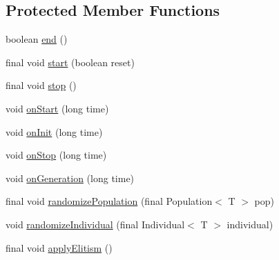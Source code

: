 \subsection*{Protected Member Functions}
\begin{DoxyCompactItemize}
\item 
boolean \hyperlink{classjenes_1_1_genetic_algorithm_3_01_t_01extends_01_chromosome_01_4_a41376d72c82d4503693eebb3832cf772}{end} ()
\item 
final void \hyperlink{classjenes_1_1_genetic_algorithm_3_01_t_01extends_01_chromosome_01_4_a6fd4badfc67b0c2b0d43c6dd4a14875e}{start} (boolean reset)
\item 
final void \hyperlink{classjenes_1_1_genetic_algorithm_3_01_t_01extends_01_chromosome_01_4_a6d0de9962bff7d63a4c197eeef6da7d0}{stop} ()
\item 
void \hyperlink{classjenes_1_1_genetic_algorithm_3_01_t_01extends_01_chromosome_01_4_a0ed4a97cf7e3266913eaad8092913de3}{on\-Start} (long time)
\item 
void \hyperlink{classjenes_1_1_genetic_algorithm_3_01_t_01extends_01_chromosome_01_4_a85479397ce0f8bd995b97fa91f4d6690}{on\-Init} (long time)
\item 
void \hyperlink{classjenes_1_1_genetic_algorithm_3_01_t_01extends_01_chromosome_01_4_a04258af6f64ec98561b015651d20f9ea}{on\-Stop} (long time)
\item 
void \hyperlink{classjenes_1_1_genetic_algorithm_3_01_t_01extends_01_chromosome_01_4_aed0d630f1e0b290bb87ba9ab8b164b89}{on\-Generation} (long time)
\item 
final void \hyperlink{classjenes_1_1_genetic_algorithm_3_01_t_01extends_01_chromosome_01_4_a7824bcf504331528000af8be62073d53}{randomize\-Population} (final Population$<$ T $>$ pop)
\item 
void \hyperlink{classjenes_1_1_genetic_algorithm_3_01_t_01extends_01_chromosome_01_4_a7cefcc35bf6c98eb9b7c33c074b32d69}{randomize\-Individual} (final Individual$<$ T $>$ individual)
\item 
final void \hyperlink{classjenes_1_1_genetic_algorithm_3_01_t_01extends_01_chromosome_01_4_a85647664d61cca550ed40dd70b074365}{apply\-Elitism} ()
\end{DoxyCompactItemize}
